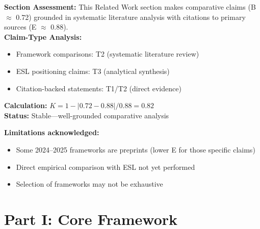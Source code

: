 \documentclass[11pt,a4paper]{article}
\begin{document}
\begin{eslbox}
\textbf{Section Assessment:} This Related Work section makes comparative claims (B $\approx$ 0.72) grounded in systematic literature analysis with citations to primary sources (E $\approx$ 0.88). \\[0.3em]

\textbf{Claim-Type Analysis:}
\begin{itemize}
    \item Framework comparisons: T2 (systematic literature review)
    \item ESL positioning claims: T3 (analytical synthesis)
    \item Citation-backed statements: T1/T2 (direct evidence)
\end{itemize}

\textbf{Calculation:} $K = 1 - |0.72 - 0.88| / 0.88 = 0.82$ \\
\textbf{Status:} \textcolor{green!60!black}{Stable}---well-grounded comparative analysis

\textbf{Limitations acknowledged:}
\begin{itemize}
    \item Some 2024--2025 frameworks are preprints (lower E for those specific claims)
    \item Direct empirical comparison with ESL not yet performed
    \item Selection of frameworks may not be exhaustive
\end{itemize}
\end{eslbox}


\part*{Part I: Core Framework}

\begin{center}
\end{center}
\end{document}
